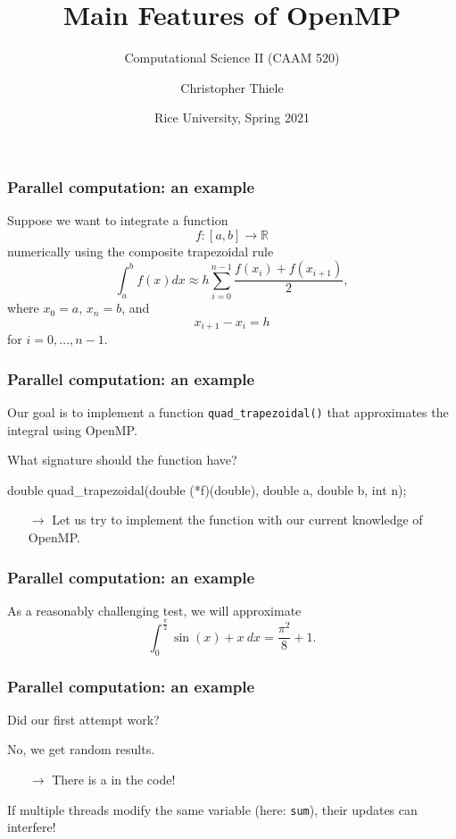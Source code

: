 \documentclass[12pt,t]{beamer}
\let\emph\relax %
\newcommand{\conclude}[1]{%
  \begin{itemize}
    \item[$\rightarrow$]#1
  \end{itemize}
}
\begin{document}
  \title{Main Features of OpenMP}
  \subtitle{Computational Science II (CAAM 520)}
  \author{Christopher Thiele}
  \date{Rice University, Spring 2021}

  \begin{frame}
    \titlepage
  \end{frame}


  \begin{frame}[fragile]
    \frametitle{Parallel computation: an example}

    Suppose we want to integrate a function
    \[f:\left[a,b\right]\rightarrow\mathbb R\]
    numerically using the composite trapezoidal rule
    \[\int_a^b f(x)dx\approx h\sum_{i=0}^{n-1}\frac{f(x_i)+f(x_{i+1})}2,\]
    where $x_0=a$, $x_n=b$, and
    \[x_{i+1}-x_i=h\]
    for $i=0,\ldots,n-1$.
  \end{frame}

  \begin{frame}[fragile]
    \frametitle{Parallel computation: an example}

    Our goal is to implement a function \texttt{quad\_trapezoidal()} that approximates the integral \emph{in parallel} using OpenMP.

    What signature should the function have?
    \pause
    \begin{code}
double quad_trapezoidal(double (*f)(double),
                        double a,
                        double b,
                        int n);
    \end{code}
    \conclude{Let us try to implement the function with our current knowledge of OpenMP.}
  \end{frame}

  \begin{frame}[fragile]
    \frametitle{Parallel computation: an example}

    As a reasonably challenging test, we will approximate
    \[\int_0^{\frac{\pi}2}\sin(x)+x\ dx=\frac{\pi^2}8+1.\]
  \end{frame}

  \begin{frame}[fragile]
    \frametitle{Parallel computation: an example}

    Did our first attempt work?

    No, we get random results.
    \conclude{There is a \emph{data race} in the code!}

    If multiple threads modify the same variable (here: \texttt{sum}), their updates can interfere!
  \end{frame}
\end{document}
